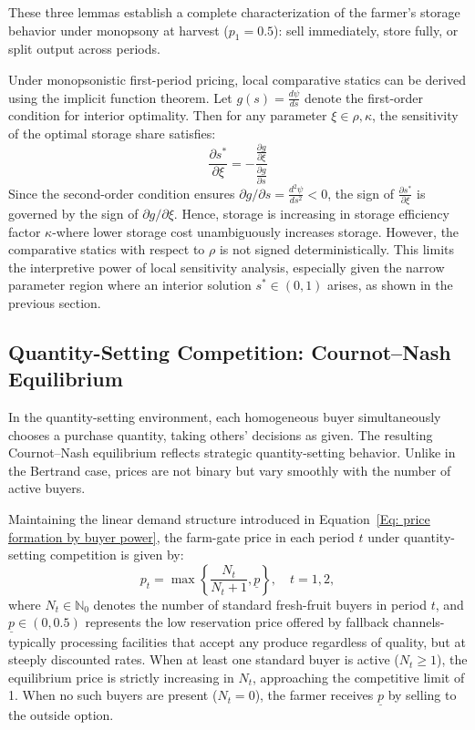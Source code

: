 These three lemmas establish a complete characterization of the farmer's storage behavior under monopsony at harvest ($p_1 = 0.5$): sell immediately, store fully, or split output across periods.  

Under monopsonistic first-period pricing, local comparative statics can be derived using the implicit function theorem. Let $g(s) = \frac{d\psi}{ds}$ denote the first-order condition for interior optimality. Then for any parameter $\xi \in {\rho, \kappa}$, the sensitivity of the optimal storage share satisfies:
$$
\frac{\partial s^*}{\partial \xi}= -\frac{\frac{\partial g}{\partial \xi}}{\frac{\partial g}{\partial s}}
$$
Since the second-order condition ensures $\partial g / \partial s = \frac{d^2\psi}{ds^2} < 0$, the sign of $\frac{\partial s^*}{\partial \xi}$ is governed by the sign of $\partial g / \partial \xi$. Hence, storage is increasing in storage efficiency factor $\kappa$-where lower storage cost unambiguously increases storage. However, the comparative statics with respect to $\rho$ is not signed deterministically. This limits the interpretive power of local sensitivity analysis, especially given the narrow parameter region where an interior solution $s^* \in (0,1)$ arises, as shown in the previous section.







\subsection{Quantity-Setting Competition: Cournot--Nash Equilibrium}
\noindent In the quantity-setting environment, each homogeneous buyer simultaneously chooses a purchase quantity, taking others' decisions as given. The resulting Cournot–Nash equilibrium reflects strategic quantity-setting behavior. Unlike in the Bertrand case, prices are not binary but vary smoothly with the number of active buyers.

Maintaining the linear demand structure introduced in Equation~\ref{Eq: price formation by buyer power}, the farm-gate price in each period $t$ under quantity-setting competition is given by:
\begin{equation}
p_t = \max\left\{\frac{N_t}{N_t + 1}, \underline{p} \right\}, \quad t = 1,2,
\end{equation}
where $N_t \in \mathbb{N}_0$ denotes the number of standard fresh-fruit buyers in period $t$, and $\underline{p} \in (0,0.5)$ represents the low reservation price offered by fallback channels-typically processing facilities that accept any produce regardless of quality, but at steeply discounted rates. When at least one standard buyer is active ($N_t \geq 1$), the equilibrium price is strictly increasing in $N_t$, approaching the competitive limit of 1. When no such buyers are present ($N_t = 0$), the farmer receives $\underline{p}$ by selling to the outside option.

